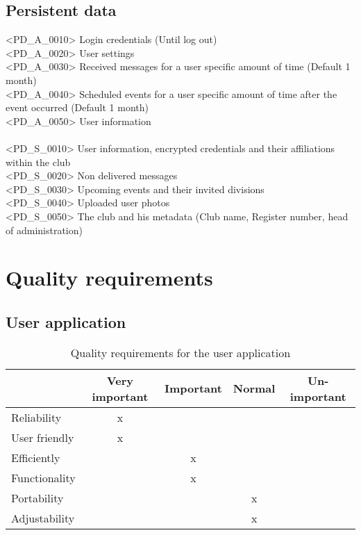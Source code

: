 \section{Persistent data}
<PD\_A\_0010> Login credentials (Until log out) \\
<PD\_A\_0020> User settings \\
<PD\_A\_0030> Received messages for a user specific amount of time (Default 1 month) \\
<PD\_A\_0040> Scheduled events for a user specific amount of time after the event occurred (Default 1 month) \\
<PD\_A\_0050> User information \\
\\
<PD\_S\_0010> User information, encrypted credentials and their affiliations within the club \\
<PD\_S\_0020> Non delivered messages \\
<PD\_S\_0030> Upcoming events and their invited divisions \\
<PD\_S\_0040> Uploaded user photos \\
<PD\_S\_0050> The club and his metadata (Club name, Register number, head of administration) \\

\chapter{Quality requirements}
\section{User application}

\begin{table}[h]
  \begin{tabular}{| l || c | c | c | c |}
      \hline
      & Very important & Important & Normal & Un-important \\ \hline \hline
      Reliability & x & & & \\ \hline
      User friendly & x & & & \\ \hline
      Efficiently & & x & & \\ \hline
      Functionality & & x & & \\ \hline
      Portability & & & x &  \\ \hline
      Adjustability & & & x &  \\ \hline
  \end{tabular}
  \caption{Quality requirements for the user application}
\end{table}

